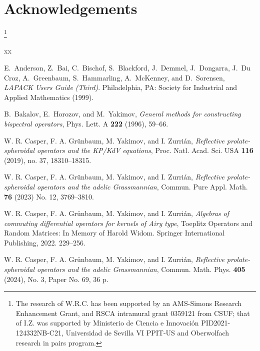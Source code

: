 \documentclass[11pt]{amsart}
\theoremstyle{plain}
\theoremstyle{named}
\begin{document}
\section*{Acknowledgements}
\thanks{The research of W.R.C. has been supported by an AMS-Simons Research Enhancement Grant, and RSCA intramural grant 0359121 from CSUF; that of I.Z. was supported 
by Ministerio de Ciencia e Innovaci\'on PID2021-124332NB-C21, Universidad de Sevilla VI PPIT-US and Oberwolfach research in pairs program.}


\begin{thebibliography}{xx}

 E.~Anderson, Z.~Bai, C.~Bischof, S.~Blackford, J.~Demmel, J.~Dongarra, J.~Du Croz, A.~Greenbaum,  S.~Hammarling, A.~McKenney, and D.~Sorensen, {\emph{LAPACK Users Guide (Third)}}. Philadelphia, PA: Society for Industrial and Applied Mathematics (1999).

 B.~Bakalov, E.~Horozov, and M.~Yakimov, {\em{General methods for constructing bispectral operators}}, 
Phys. Lett. A {\bf{222}} (1996), 59--66.



 W. R. Casper, F. A. Gr\"unbaum, M. Yakimov, and I. Zurri\'an, {\em{Reflective prolate-spheroidal operators and the KP/KdV equations}}, 
Proc. Natl. Acad. Sci. USA {\bf{116}} (2019), no. 37, 18310--18315.

 W. R. Casper, F. A. Gr\"unbaum, M. Yakimov, and I. Zurri\'an, {\em{Reflective prolate-spheroidal operators and the adelic Grassmannian}}, 
Commun. Pure Appl. Math. {\bf76} (2023) No. 12, 3769--3810.

 W. R. Casper, F. A. Gr\"unbaum, M. Yakimov, and I. Zurri\'an, {\em{Algebras of commuting differential operators for kernels of Airy type}}, 
Toeplitz Operators and Random Matrices: In Memory of Harold Widom. Springer International Publishing, 2022. 229--256.

 W. R. Casper, F. A. Gr\"unbaum, M. Yakimov, and I. Zurri\'an, {\em{Reflective prolate-spheroidal operators and the adelic Grassmannian}}, 
Commun. Math. Phys. {\bf405} (2024), No. 3, Paper No. 69, 36 p.


\end{thebibliography}
\end{document}

